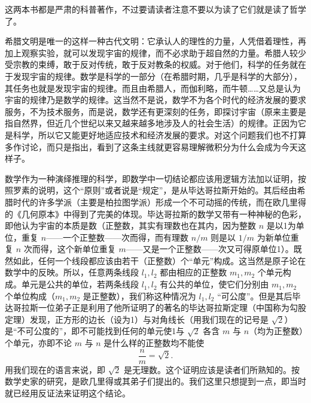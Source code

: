 这两本书都是严肃的科普著作，不过要请读者注意不要以为读了它们就是读了哲学了。

希腊文明是唯一的这样一种古代文明：它承认人的理性的力量，人凭借着理性，再加上观察实验，就可以发现宇宙的规律，而不必求助于超自然的力量。希腊人较少受宗教的束缚，敢于反对传统，敢于反对教条的权威。对于他们，科学的任务就在于发现宇宙的规律。数学是科学的一部分（在希腊时期，几乎是科学的大部分），其任务也就是发现宇宙的规律。而且由希腊人，而伽利略，而牛顿……又总是认为宇宙的规律乃是数学的规律。这当然不是说，数学不为各个时代的经济发展的要求服务，不为技术服务，而是说，数学还有更深刻的任务，即探讨宇宙（原来主要是指自然界，但近几个世纪以来又越来越多地涉及人的社会生活）的规律。正因为它是科学，所以它又能更好地适应技术和经济发展的要求。对这个问题我们也不打算多作讨论，而只是指出，看到了这条主线就更容易理解微积分为什么会成为今天这样子。

数学作为一种演绎推理的科学，即数学中一切结论都应该用逻辑方法加以证明，按照罗素的说明，这个“原则”或者说是“规定”，是从毕达哥拉斯开始的。其后经由希腊时代的许多学派（主要是柏拉图学派）形成一个不可动摇的传统，而在欧几里得的《几何原本》中得到了完美的体现。毕达哥拉斯的数学又带有一种神秘的色彩，即他认为宇宙的本质是数（正整数，其实有理数也在其内，因为整数 $n$ 是以1为单位，重复 $n$——一个正整数——次而得，而有理数 $n/m$ 则是以 $1/m$ 为新单位重复 $n$ 次而得，这个新单位重复 $m$——又是一个正整数——次又可得原单位1）。既然如此，任何一个线段都应该由若干（正整数）个“单元”构成。这当然是原子论在数学中的反映。所以，任意两条线段 $l_1,l_2$ 都由相应的正整数 $m_1,m_2$ 个单元构成。单元是公共的单位，若两条线段 $l_1,l_2$ 有公共的单位，使它们分别由 $m_1,m_2$ 个单位构成（$m_1,m_2$ 是正整数），我们称这种情况为 $l_1,l_2$ “可公度”。但是其后毕达哥拉斯一位弟子正是利用了他所证明了的著名的毕达哥拉斯定理（中国称为勾股定理）发现，正方形的边长（设为1）与对角线长（用我们现在的记号是 $\sqrt2$）是“不可公度的”，即不可能找到任何的单元使1与 $\sqrt2$ 各含 $m$ 与 $n$（均为正整数）个单元，亦即不论 $m$ 与 $n$ 是什么样的正整数均不能使
\[
\frac{n}{m}=\sqrt2.
\]
用我们现在的语言来说，即 $\sqrt2$ 是无理数。这个证明应该是读者们所熟知的。按数学史家的研究，是欧几里得或其弟子们提出的。我们这里只想提到一点，即当时就已经用反证法来证明这个结论。

